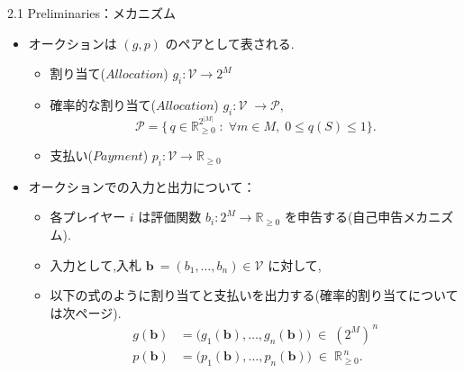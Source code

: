 \documentclass[dvipdfmx,autodetect-engine]{beamer}
\begin{document}
\begin{frame}{2.1  Preliminaries：メカニズム}
  \small
  \begin{itemize}
    \item オークションは $(g, p)$ のペアとして表される.
     \begin{itemize}
        \item 割り当て($Allocation$) $g_i: \mathcal{V} \rightarrow 2^M$
        \item 確率的な割り当て($Allocation$) $g_i : \mathcal{V}\;\longrightarrow\mathcal{P}$,
        \begin{equation*}
        \textstyle
        \mathcal{P}=\bigl\{\,
        q\in\mathbb{R}^{2^{|M|}}_{\ge0}\;:\;
        \forall m\in M,\;
        0\leq q(S)\le1
        \bigr\}.
        \end{equation*}
        \item 支払い($Payment$) $p_i: \mathcal{V} \rightarrow \mathbb{R}_{\geq 0}$
      \end{itemize}
    \item オークションでの入力と出力について：
    \begin{itemize}
        \item 各プレイヤー $i$ は評価関数
        $b_i:2^{M}\to\mathbb{R}_{\ge 0}$ を申告する(自己申告メカニズム).
        \item 入力として,入札 $\mathbf{b}\ = (b_1, \ldots, b_n) \in \mathcal{V}$ に対して,
        \item 以下の式のように割り当てと支払いを出力する(確率的割り当てについては次ページ).
        \begin{equation*}
        \begin{aligned}
        g(\mathbf{b}) &= \bigl(g_{1}(\mathbf{b}),\dots,g_{n}(\mathbf{b})\bigr)
                      \;\in\;(2^{M})^{\,n}\\[4pt]
        p(\mathbf{b}) &= \bigl(p_{1}(\mathbf{b}),\dots,p_{n}(\mathbf{b})\bigr)
                      \;\in\;\mathbb{R}^{\,n}_{\ge 0}.
        \end{aligned}
        \end{equation*}
    \end{itemize}
  \end{itemize}
\end{frame}
\end{document}
